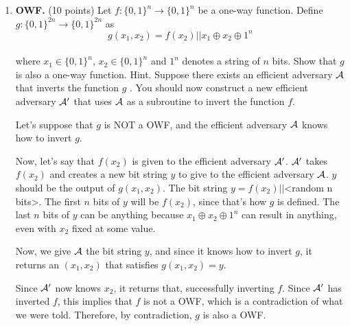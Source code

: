 \documentclass[11pt]{article}
\begin{document}
\begin{enumerate}
\item {\bfseries OWF.} (10 points)
Let $f:\{0,1\}^n \rightarrow \{0,1\}^n$ be a one-way function. Define
$g: \{0,1\}^{2n}\rightarrow \{0,1\}^{2n}$ as \[g(x_1,x_2)=f(x_2)||x_1\oplus x_2 \oplus 1^n\]\\
where $x_1 \in \{0,1\}^n$, $x_2 \in \{0,1\}^n$ and $1^n$ denotes a string of $n$ bits. Show that $g$ is also a one-way function. \newline 
{\footnotesize Hint. Suppose there exists an efficient adversary ${\mathcal A}$ that inverts the function $g$ . 
  You should now construct a new efficient adversary ${\mathcal A}'$ that uses ${\mathcal A}$ as a subroutine to invert the function $f$.} \newline 
    {\bfseries

    Let's suppose that $g$ is NOT a OWF, and the efficient adversary ${\mathcal A}$ knows how to invert $g$. \newline

    Now, let's say that $f(x_2)$ is given to the efficient adversary ${\mathcal A}'$. ${\mathcal A}'$ takes $f(x_2)$ and creates a new bit string $y$ to give to the efficient adversary ${\mathcal A}$. $y$ should be the output of $g(x_1, x_2)$. The bit string $y = f(x_2) || $<random n bits>. The first $n$ bits of $y$ will be $f(x_2)$, since that's how $g$ is defined. The last $n$ bits of $y$ can be anything because $x_1 \oplus x_2 \oplus 1^n$ can result in anything, even with $x_2$ fixed at some value. \newline

    Now, we give ${\mathcal A}$ the bit string $y$, and since it knows how to invert $g$, it returns an $(x_1, x_2)$ that satisfies $g(x_1, x_2) = y$. \newline

    Since ${\mathcal A}'$ now knows $x_2$, it returns that, successfully inverting $f$. Since ${\mathcal A}'$ has inverted $f$, this implies that $f$ is not a OWF, which is a contradiction of what we were told. Therefore, by contradiction, $g$ is also a OWF.
    }
     \newpage





\end{enumerate}
\end{document}
